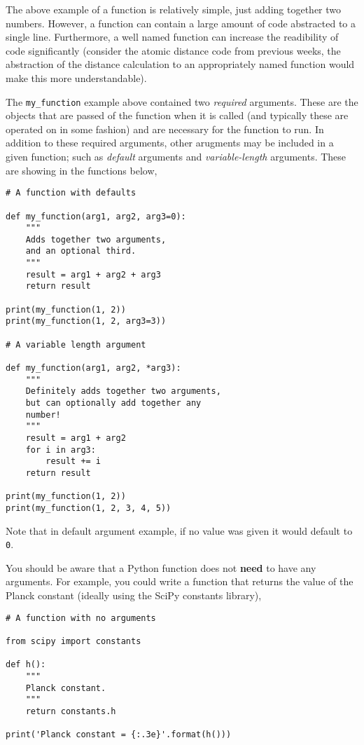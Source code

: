 \documentclass[a4paper]{article}
\begin{document}
The above example of a function is relatively simple, just adding together two numbers.
However, a function can contain a large amount of code abstracted to a single line.
Furthermore, a well named function can increase the readibility of code significantly (consider the atomic distance code from previous weeks, the abstraction of the distance calculation to an appropriately named function would make this more understandable).

The \texttt{my\_function} example above contained two \emph{required} arguments.
These are the objects that are passed of the function when it is called (and typically these are operated on in some fashion) and are necessary for the function to run.
In addition to these required arguments, other arugments may be included in a given function; such as \emph{default} arguments and \emph{variable-length} arguments.
These are showing in the functions below,
\begin{lstlisting}
# A function with defaults

def my_function(arg1, arg2, arg3=0):
    """
    Adds together two arguments,
    and an optional third.
    """
    result = arg1 + arg2 + arg3
    return result

print(my_function(1, 2))
print(my_function(1, 2, arg3=3))

# A variable length argument

def my_function(arg1, arg2, *arg3):
    """
    Definitely adds together two arguments,
    but can optionally add together any
    number!
    """
    result = arg1 + arg2
    for i in arg3:
        result += i
    return result

print(my_function(1, 2))
print(my_function(1, 2, 3, 4, 5))
\end{lstlisting}
Note that in default argument example, if no value was given it would default to \texttt{0}.

You should be aware that a Python function does not \textbf{need} to have any arguments.
For example, you could write a function that returns the value of the Planck constant (ideally using the SciPy constants library),
\begin{lstlisting}
# A function with no arguments

from scipy import constants

def h():
    """
    Planck constant.
    """
    return constants.h

print('Planck constant = {:.3e}'.format(h()))
\end{lstlisting}
\end{document}
